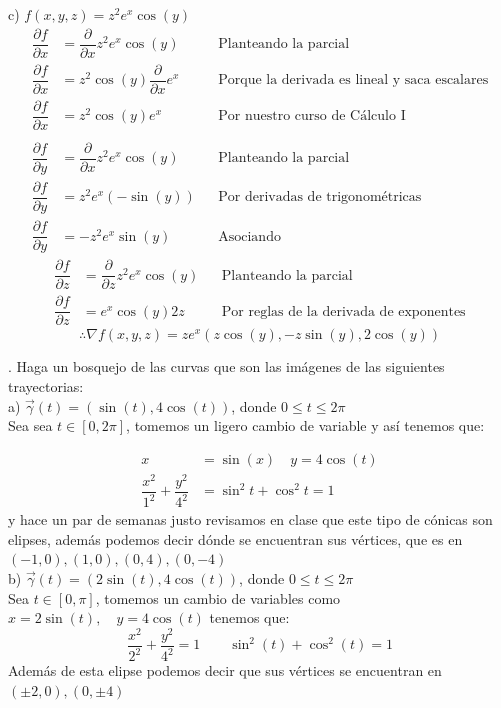 \documentclass[letterpaper]{article}
\renewcommand{\d}{\partial}
\renewcommand{\*}{\cdot}
\theoremstyle{definition}
\begin{document}
\noindent c) $f(x,y,z) = z^2e^x\cos(y)$
\begin{align*}
	\dfrac{\d f}{\d x} &= \dfrac{\d}{\d x} z^2e^x\cos(y) &&\text{Planteando la parcial}\\
	\dfrac{\d f}{\d x} &= z^2\cos(y)\dfrac{\d}{\d x} e^x &&\text{Porque la derivada es lineal y saca escalares}\\
	\dfrac{\d f}{\d x} &= z^2\cos(y)e^x &&\text{Por nuestro curso de Cálculo I}\\
	\\
	\dfrac{\d f}{\d y} &= \dfrac{\d}{\d x} z^2e^x\cos(y) &&\text{Planteando la parcial}\\
	\dfrac{\d f}{\d y} &= z^2e^x(-\sin(y)) &&\text{Por derivadas de trigonométricas}\\
	\dfrac{\d f}{\d y} &= -z^2e^x\sin(y) &&\text{Asociando }
\end{align*}
\begin{align*}
		\dfrac{\d f}{\d z} &= \dfrac{\d}{\d z} z^2e^x\cos(y) &&\text{Planteando la parcial}\\
	\dfrac{\d f}{\d z} &= e^x\cos(y)2z &&\text{Por reglas de la derivada de exponentes}
\end{align*}
\[ \therefore \nabla f(x,y,z) = ze^x(z\cos(y), -z\sin(y), 2\cos(y)) \]



. Haga un bosquejo de las curvas que son las imágenes de las siguientes trayectorias:\\


\noindent a) $\vec{\gamma}(t) = (\sin(t), 4\cos(t))$, donde $0 \leq t \leq 2\pi$\\
Sea sea $ t \in [0,2\pi] $, tomemos un ligero cambio de variable y así tenemos que:

\begin{align*}
x &= \sin(x)  \quad y= 4\cos(t)\\
\dfrac{x^2 }{1^2}+ \dfrac{y^2}{4^2} &= 	\sin^2t + \cos^2t = 1
\end{align*}
y hace un par de semanas justo revisamos en clase que este tipo de cónicas son elipses, además podemos decir dónde se encuentran sus vértices, que es en $ (-1,0),(1,0),(0,4),(0,-4) $\\

\noindent b) $\vec{\gamma}(t) = (2\sin(t), 4\cos(t))$, donde $0 \leq t \leq 2\pi$\\
Sea $ t \in [0,\pi] $, tomemos un cambio de variables como $ x = 2\sin(t), \quad y= 4\cos(t) $ tenemos que:
\[ \dfrac{x^2}{2^2} + \dfrac{y^2}{4^2} = 1 \quad\quad \sin^2(t) + \cos^2(t) = 1  \]
Además de esta elipse podemos decir que sus vértices se encuentran en $ (\pm 2,0), (0,\pm 4) $
\end{document}

